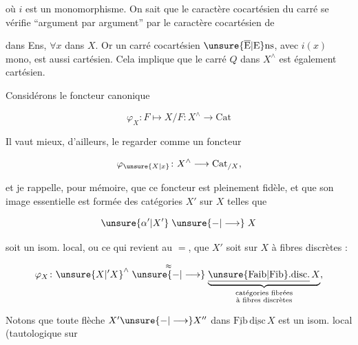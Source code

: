 où $i$ est un monomorphisme. On sait que le caractère cocartésien du carré se vérifie ``argument par argument'' par le caractère cocartésien de


dans Ens, $\forall x$ dans $X$. Or un  carré cocartésien  $\unsure{\overline{\mathrm E}|\mathrm E}\mathrm{ns}$, avec $i(x)$ mono, est aussi cartésien. Cela implique que le carré $Q$ dans $X^\wedge$ est également cartésien.

Considérons  le foncteur canonique

\[
\varphi_X\colon F\longmapsto X/F\colon X^\wedge\longrightarrow\mathrm{Cat}
\]

Il vaut mieux, d'ailleurs, le regarder comme un foncteur

\[
\varphi_{\unsure{X|x}}\colon X^\wedge\longrightarrow\mathrm{Cat}_{/X},
\]

et je rappelle, pour mémoire, que ce foncteur est pleinement fidèle, et que son image essentielle est formée des catégories $X'$ sur $X$ telles que

\[
\unsure{\alpha'|X'}\mathrel{\unsure{-|\longrightarrow}}X
\]

soit un isom. local, ou ce qui revient au $=$, que  $X'$ soit \uline{} sur $X$ à fibres discrètes :

\[
\varphi_X\colon \unsure{X|{}'X}^\wedge
\overset{\approx}{\mathrel{\unsure{-|\longrightarrow}}}
\underbrace{\underline{\unsure{\mathrm{Faib}|\mathrm{Fib}}\mathrm{.disc.}}\,X}_{\substack{\text{catégories fibrées}\\\text{à fibres discrètes}}} ,
\]

Notons que toute flèche $X'\unsure{-|\longrightarrow}X''$ dans $\underline{\mathrm{Fib}}\,\underline{\mathrm{disc}}\,X$  est un isom. local (tautologique sur


